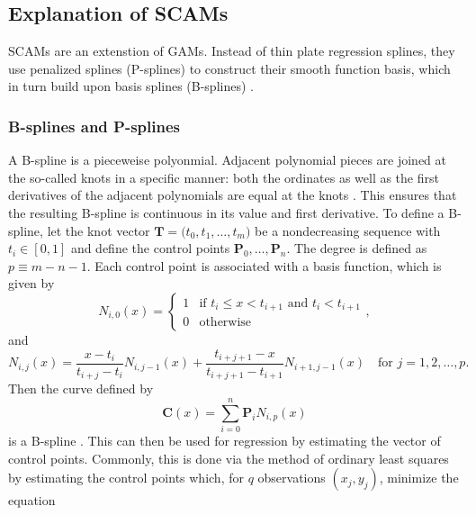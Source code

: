 \subsection{Explanation of SCAMs}

SCAMs \parencite{Pya2010,Pya2015} are an extenstion of GAMs.  Instead of thin plate regression splines, they use penalized splines (P-splines) \parencite{Eilers1996} to construct their smooth function basis, which in turn build upon basis splines (B-splines) \parencite{Boor2001,Curry1947}.

\subsubsection{B-splines and P-splines}
\label{sec:BSplinesPSplines}

A B-spline is a pieceweise polyonmial.  Adjacent polynomial pieces are joined at the so-called knots in a specific manner:  both the ordinates as well as the first derivatives of the adjacent polynomials are equal at the knots \parencite{Eilers1996}.  This ensures that the resulting B-spline is continuous in its value and first derivative.  To define a B-spline, let the knot vector \(\symbf{T} = \bigl(t_0, t_1, \ldots, t_m\bigr)\) be a nondecreasing sequence with \(t_i \in [0, 1]\) and define the control points \(\symbf{P}_0, \ldots, \symbf{P}_n\).  The degree is defined as \(p \equiv m - n - 1\).  Each control point is associated with a basis function, which is given by
\begin{equation}
  \label{eq:BSplineBasisFunctionsDegreeZero}
  N_{i, 0}(x) =
  \begin{cases}
    1 &\text{if } t_i \leq x < t_{i + 1} \text{ and } t_i < t_{i + 1} \\
    0 &\text{otherwise}
  \end{cases},
\end{equation}
and
\begin{equation}
  \label{eq:BSplineBasisFunctionsDegreeNonzero}
  N_{i, j}(x) = \frac{x - t_i}{t_{i + j} - t_i} N_{i, j - 1}(x) + \frac{t_{i + j + 1} - x}{t_{i + j + 1} - t_{i + 1}} N_{i + 1, j - 1}(x) \quad \text{for } j = 1, 2, \ldots, p.
\end{equation}
Then the curve defined by
\begin{equation}
  \label{eq:BSplineCurveDefinition}
  \symbf{C}(x) = \sum_{i = 0}^n \symbf{P}_i N_{i, p}(x)
\end{equation}
is a B-spline \parencite{Weisstein2017a}.  This can then be used for regression by estimating the vector of control points.  Commonly, this is done via the method of ordinary least squares \parencite{Bollaerts2006} by estimating the control points which, for \(q\) observations \((x_j, y_j)\), minimize the equation
